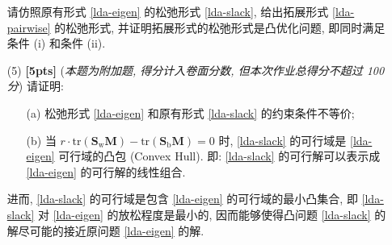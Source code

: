 \documentclass[a4paper]{article}
\numberwithin{equation}{section}
\theoremstyle{definition}
\def \Sw {\mathbf{S}_{\mathrm{w}}}
\def \Sb {\mathbf{S}_{\mathrm{b}}}
\def \M {\mathbf{M}}
\newcommand\sbr[1]{\left( #1 \right)}
\newcommand\tr[1]{\mathrm{tr}\sbr{#1}}
\begin{document}
\begin{enumerate}
\begin{equation}
		      \label{lda-slack}
	      \end{equation}
	      请仿照原有形式 \eqref{lda-eigen} 的松弛形式 \eqref{lda-slack}, 给出拓展形式 \eqref{lda-pairwise} 的松弛形式, 并证明拓展形式的松弛形式是凸优化问题, 即同时满足条件 (i) 和条件 (ii).
	\item[(5)] \textbf{[5pts]} (\textit{本题为附加题, 得分计入卷面分数, 但本次作业总得分不超过 100 分}) 请证明:
	      \begin{itemize}
		      \item [(a)] 松弛形式 \eqref{lda-eigen} 和原有形式 \eqref{lda-slack} 的约束条件不等价;
		      \item [(b)] 当 $r \cdot \tr{\Sw \M} - \tr{\Sb \M} = 0$ 时, \eqref{lda-slack} 的可行域是 \eqref{lda-eigen} 可行域的凸包 (Convex Hull). 即: \eqref{lda-slack} 的可行解可以表示成 \eqref{lda-eigen} 的可行解的线性组合.
	      \end{itemize}
	      进而, \eqref{lda-slack} 的可行域是包含 \eqref{lda-eigen} 的可行域的最小凸集合, 即 \eqref{lda-slack} 对 \eqref{lda-eigen} 的放松程度是最小的, 因而能够使得凸问题 \eqref{lda-slack} 的解尽可能的接近原问题 \eqref{lda-eigen} 的解.
\end{enumerate}
\end{document}
